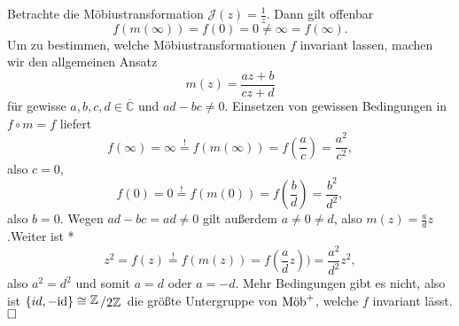 \documentclass[11pt]{book}
\numberwithin{dummy}{section}
\theoremstyle{nonumberbreak}
\newenvironment{prob}[1][]{\ifthenelse{\equal{#1}{}}{\problem}{\problem[#1]}\rm}{\endproblem}
\newenvironment{sol}[1][]{\ifthenelse{\equal{#1}{}}{\solution}{\solution[#1]}\rm}{\endsolution}
\newcommand{\Z}{\mathbb{Z}}
\newcommand{\CC}{\overline{\mathbb{C}}}
\newcommand{\id}{\mathrm{id}}
\newcommand{\mob}{\textup{Möb}^+}
\newcommand{\slant}[2]{{\raisebox{.1em}{$#1$}\left/\raisebox{-.1em}{$#2$}\right.}}
\begin{document}
\begin{spacing}{1.4}
\begin{prob}
\begin{sol}
Betrachte die Möbiustransformation $\mathcal{J}(z)=\frac{1}{z}$. Dann gilt offenbar 
$$f(m(\infty))=f(0) = 0 \neq \infty = f(\infty).$$
Um zu bestimmen, welche Möbiustransformationen $f$ invariant lassen, machen wir den allgemeinen Ansatz 
$$m(z)=\frac{az+b}{cz+d}$$
für gewisse $a,b,c,d\in \CC$ und $ad-bc\neq 0$. Einsetzen von gewissen Bedingungen in $f\circ m =f$ liefert
$$f(\infty)=\infty \overset{!}{=}f(m(\infty)) = f\left(\frac{a}{c}\right) = \frac{a^2}{c^2},$$
also $c=0$, 
$$f(0)=0\overset{!}{=} f(m(0))=f\left(\frac{b}{d}\right) = \frac{b^2}{d^2},$$
also $b=0$. Wegen $ad-bc=ad\neq0$ gilt außerdem $a\neq0\neq d$, also $m(z)=\frac{a}{d}z$.Weiter ist *$$z^2=f(z)\overset{!}{=} f(m(z))= f\left(\frac{a}{d}z\right))=\frac{a^2}{d^2}z^2,$$
also $a^2=d^2$ und somit $a=d$ oder $a=-d$. Mehr Bedingungen gibt es nicht, also ist $\{id, -\id\} \cong \slant{\Z}{2\Z}$ die größte Untergruppe von $\mob$, welche $f$ invariant lässt. $\hfill \Box$



\end{sol}



\end{prob}



\end{spacing}
\end{document}
